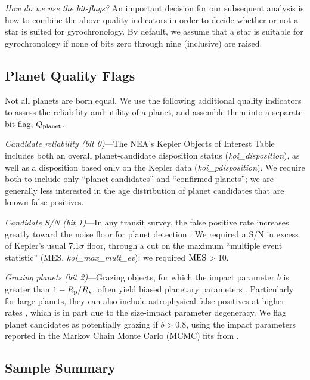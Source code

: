 \documentclass[11pt,twocolumn,tighten]{aastex63}
\begin{document}
{\it How do we use the bit-flags?}
An important decision for our subsequent analysis is how to combine
the above quality indicators in order to decide whether or not a star is suited for
gyrochronology.  By default, we assume that a star is suitable for
gyrochronology if none of bits zero through nine (inclusive) are
raised.


\subsection{Planet Quality Flags}
\label{subsec:plflags}
Not all planets are born equal.
We use the following additional quality indicators to assess 
the reliability and utility of a planet, and assemble them into a separate bit-flag,
$Q_{\rm planet}$.

{\it Candidate reliability (bit 0)}---The NEA's Kepler Objects of Interest Table
includes both an overall planet-candidate disposition status
({\it koi\_disposition}), as well as a disposition based only on the Kepler
data ({\it koi\_pdisposition}).
We require both to include only
``planet candidates'' and ``confirmed planets''; we are generally less interested
in the age distribution of planet candidates that are known false positives.

{\it Candidate S/N (bit 1)}---In any transit survey, the false positive rate increases
greatly toward the noise floor for planet detection \citep[e.g.][]{2002ApJ...564..495J}.  We
required a S/N in excess of Kepler's usual 7.1$\sigma$ floor, through a cut on the
maximum
``multiple event statistic'' (MES, {\it koi\_max\_mult\_ev}): we required ${\rm MES}$$>$10.

{\it Grazing planets (bit 2)}---Grazing objects, for which the impact
parameter $b$ is greater than $1-R_{\rm p}/R_\star$,
often yield biased planetary parameters
\citep[e.g.][]{2022AJ....163..111G}.
Particularly for large planets, they can also include
astrophysical false positives at higher rates \citep{2016ApJ...822...86M}, which is
in part due to the size-impact parameter degeneracy.
We flag planet candidates as potentially grazing if $b>0.8$, 
using the impact parameters reported in the Markov Chain
Monte Carlo (MCMC) fits from \citet{Thompson_2018}.


\subsection{Sample Summary}
\label{subsec:tally}
\end{document}
